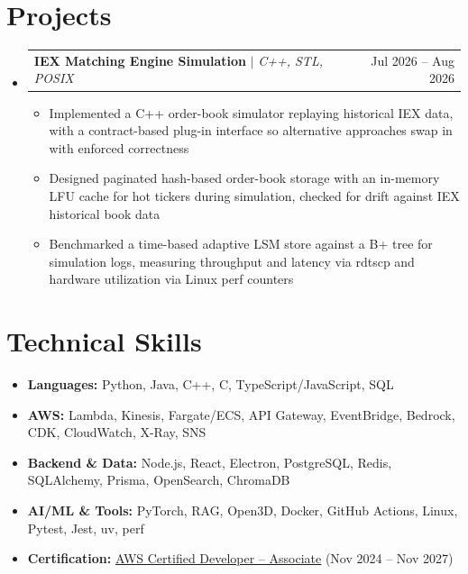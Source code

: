 \documentclass[letterpaper,10pt]{article}
\makeatletter
\newcommand{\resumeItem}[1]{\item{#1}\vspace{-1pt}}
\newcommand{\resumeProjectHeading}[2]{%
  \item
  \begin{tabular*}{\textwidth}{l@{\extracolsep{\fill}}r}
    #1 & #2 \\
  \end{tabular*}\vspace{-6pt}%
}
\newcommand{\resumeSubHeadingListStart}{\begin{itemize}[leftmargin=0in, label={}, itemsep=0pt, topsep=2pt]}
\newcommand{\resumeSubHeadingListEnd}{\end{itemize}}
\newcommand{\resumeItemListStart}{\begin{itemize}[leftmargin=0.18in, itemsep=0pt, topsep=1pt, parsep=0pt]}
\newcommand{\resumeItemListEnd}{\end{itemize}\vspace{0pt}}
\makeatother
\begin{document}
\section{Projects}
\resumeSubHeadingListStart
  \resumeProjectHeading
    {\textbf{IEX Matching Engine Simulation} $|$ \textit{C++, STL, POSIX}}{Jul 2026 -- Aug 2026}
  \resumeItemListStart
    \resumeItem{Implemented a C++ order-book simulator replaying historical IEX data, with a contract-based plug-in interface so alternative approaches swap in with enforced correctness}
    \resumeItem{Designed paginated hash-based order-book storage with an in-memory LFU cache for hot tickers during simulation, checked for drift against IEX historical book data}
    \resumeItem{Benchmarked a time-based adaptive LSM store against a B+ tree for simulation logs, measuring throughput and latency via rdtscp and hardware utilization via Linux perf counters}
  \resumeItemListEnd
\resumeSubHeadingListEnd

\section{Technical Skills}
\begin{itemize}[leftmargin=0in, label={}, itemsep=0pt, topsep=2pt]
  \small
  \item{\textbf{Languages:} Python, Java, C++, C, TypeScript/JavaScript, SQL}
  \item{\textbf{AWS:} Lambda, Kinesis, Fargate/ECS, API Gateway, EventBridge, Bedrock, CDK, CloudWatch, X-Ray, SNS}
  \item{\textbf{Backend \& Data:} Node.js, React, Electron, PostgreSQL, Redis, SQLAlchemy, Prisma, OpenSearch, ChromaDB}
  \item{\textbf{AI/ML \& Tools:} PyTorch, RAG, Open3D, Docker, GitHub Actions, Linux, Pytest, Jest, uv, perf}
  \item{\textbf{Certification:} \href{https://www.credly.com/badges/d2406a97-d937-47de-823b-724981159d3b/public_url}{\underline{AWS Certified Developer -- Associate}} (Nov 2024 -- Nov 2027)}
\end{itemize}
\end{document}

